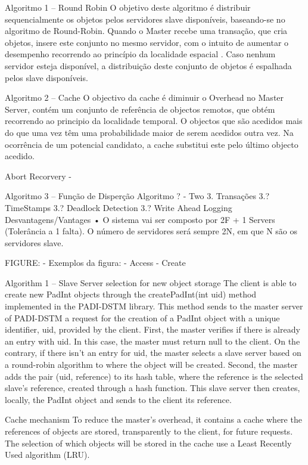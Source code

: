 \documentclass[times, 10pt,twocolumn]{article}
\begin{document}
Algoritmo 1 – Round Robin
O objetivo deste algoritmo é distribuir sequencialmente os objetos pelos servidores slave disponíveis, baseando-se no algoritmo de Round-Robin.  
Quando o Master recebe uma transação, que cria objetos, insere este conjunto no mesmo servidor, com o intuito de aumentar o desempenho recorrendo ao princípio da localidade espacial . Caso nenhum servidor esteja disponível, a distribuição deste conjunto de objetos é espalhada pelos slave disponíveis.

Algoritmo 2 – Cache
O objectivo da cache é diminuir o Overhead no Master Server, contém um conjunto de referência de objectos remotos, que obtém recorrendo ao principio da localidade temporal. O objectos que são acedidos mais do que uma vez têm uma probabilidade maior de serem acedidos outra vez. Na ocorrência de um potencial candidato, a cache substitui este pelo último objecto acedido.

Abort Recorvery - 

Algoritmo 3 – Função de Disperção
Algoritmo ? - Two
3. Transações
3.? TimeStamps
3.? Deadlock Detection
3.? Write Ahead Logging
Desvantagens/Vantages
•	O sistema vai ser composto por 2F + 1 Servers (Tolerância a 1 falta). O número de servidores será sempre 2N, em que N são os servidores slave.

FIGURE: 
  - Exemplos da figura:
    - Access
    - Create


Algorithm 1 – Slave Server selection for new object storage
The client is able to create new PadInt objects through the createPadInt(int uid) method implemented in the PADI-DSTM library. This method sends to the master server of PADI-DSTM a request for the creation of a PadInt object with a unique identifier, uid, provided by the client. First, the master verifies if there is already an entry with uid. In this case, the master must return null to  the client. On the contrary, if there isn’t an entry for uid, the master selects a slave server based on a round-robin algorithm to where the object will be created. Second, the master adds the pair (uid, reference) to its hash table, where the reference is the selected slave’s reference, created through a hash function. This slave server then creates, locally, the PadInt object and sends to the client its reference.

Cache mechanism
To reduce the master’s overhead, it contains a cache where the references of objects are stored, transparently to the client, for future requests. The selection of which objects will be stored in the cache use a Least Recently Used algorithm (LRU).
\end{document}

